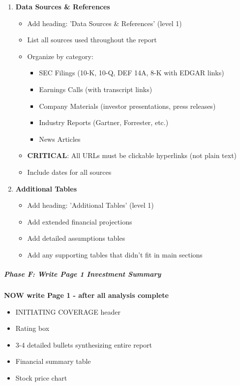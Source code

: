 \documentclass[11pt]{article}
\begin{document}
\begin{enumerate}[leftmargin=*,itemsep=2pt,topsep=2pt]
\item {} \textbf{Data Sources \& References}
\begin{itemize}[leftmargin=*,itemsep=2pt,topsep=2pt]
\item {} Add heading: 'Data Sources \& References' (level 1)
\item {} List all sources used throughout the report
\item {} Organize by category:
\begin{itemize}[leftmargin=*,itemsep=2pt,topsep=2pt]
\item {} SEC Filings (10-K, 10-Q, DEF 14A, 8-K with EDGAR links)
\item {} Earnings Calls (with transcript links)
\item {} Company Materials (investor presentations, press releases)
\item {} Industry Reports (Gartner, Forrester, etc.)
\item {} News Articles
\end{itemize}
\item {} \textbf{CRITICAL}: All URLs must be clickable hyperlinks (not plain text)
\item {} Include dates for all sources
\end{itemize}
\item {} \textbf{Additional Tables}
\begin{itemize}[leftmargin=*,itemsep=2pt,topsep=2pt]
\item {} Add heading: 'Additional Tables' (level 1)
\item {} Add extended financial projections
\item {} Add detailed assumptions tables
\item {} Add any supporting tables that didn't fit in main sections
\end{itemize}
\end{enumerate}

\subparagraph{Phase F: Write Page 1 Investment Summary}\mbox{}\par
\textbf{NOW write Page 1 - after all analysis complete}

\begin{itemize}[leftmargin=*,itemsep=2pt,topsep=2pt]
\item {} INITIATING COVERAGE header
\item {} Rating box
\item {} 3-4 detailed bullets synthesizing entire report
\item {} Financial summary table
\item {} Stock price chart
\end{itemize}
\end{document}
